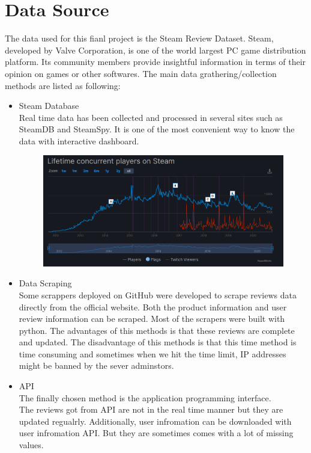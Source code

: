 \documentclass[11pt]{scrartcl}
\begin{document}
\section*{Data Source}
The data used for this fianl project  is the Steam Review Dataset. Steam, developed by Valve Corporation, is one of the world largest PC game distribution platform. Its community members provide insightful information in terms of their opinion on games or other softwares. 
The main data grathering/collection methods are listed as following:

\begin{itemize}

    \item Steam Database \\ 
    Real time data has been collected and processed in several sites such as SteamDB and SteamSpy. It is one of the most convenient way to know the data with interactive dashboard.

    \begin{figure}[!ht]
    \includegraphics[scale = 0.5]{./img/steamDB.png}
    \centering
    \end{figure}

    \item Data Scraping \\
    Some scrappers deployed on GitHub were developed to scrape reviews data directly from the official website. Both the product information and user review information can be scraped. Most of the scrapers were built with python. The advantages of this methods is that these reviews are complete and updated. The disadvantage of this methods is that this time method is time consuming and sometimes when we hit the time limit, IP addresses might be banned by the sever adminstors.


    \item API \\ 
    The finally chosen method is the application programming interface. \\ 
    The reviews got from API are not in the real time manner but they are updated regualrly. Additionally, user infromation can be downloaded with user infromation API. But they are sometimes comes with a lot of missing values. 

\end{itemize}
\end{document}
